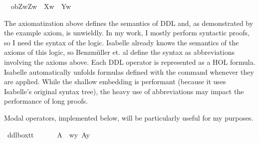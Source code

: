 \begin{isabellebody}
\ \ {\isasymlongrightarrow}ob{\isacharparenleft}Z{\isacharparenright}{\isacharparenleft}{\isasymlambda}w{\isachardot}{\isacharparenleft}Z{\isacharparenleft}w{\isacharparenright}\ {\isasymand}\ {\isasymnot}X{\isacharparenleft}w{\isacharparenright}{\isacharparenright}\ {\isasymor}\ Y{\isacharparenleft}w{\isacharparenright}{\isacharparenright}{\isachardoublequoteclose}\isanewline
%
%
\isadelimdocument
%
\endisadelimdocument
%
\isatagdocument
%
\isamarkuptrue%
%
\endisatagdocument
{\isafolddocument}%
%
\isadelimdocument
%
\endisadelimdocument
%
\begin{isamarkuptext}%
The axiomatization above defines the semantics of DDL and, as demonstrated by the example axiom,
is unwieldly. In my work, I mostly perform syntactic proofs, so I need the syntax of the logic.
Isabelle already knows the semantics of the axioms of this logic, so Benzm\"uller et. al define the syntax as abbreviations 
involving the axioms above. Each DDL operator is represented
as a HOL formula. Isabelle automatically unfolds formulas defined with the  command 
whenever they are applied. While the shallow embedding is performant (because it uses Isabelle's original 
syntax tree), the heavy use of abbreviations may impact the performance of long proofs.%
\end{isamarkuptext}\isamarkuptrue%
%
\begin{isamarkuptext}%
\noindent Modal operators, implemented below, will be particularly useful for my purposes.%
\end{isamarkuptext}\isamarkuptrue%
\isamarkupfalse%
\ ddlbox{\isacharcolon}{\isacharcolon}{\isachardoublequoteopen}t{\isasymRightarrow}t{\isachardoublequoteclose}\ {\isacharparenleft}{\isachardoublequoteopen}{\isasymbox}{\isachardoublequoteclose}{\isacharparenright}\ \isanewline
\ \ \ {\isachardoublequoteopen}{\isasymbox}\ A\ {\isasymequiv}\ {\isasymlambda}w{\isachardot}{\isasymforall}y{\isachardot}\ A{\isacharparenleft}y{\isacharparenright}{\isachardoublequoteclose}\ \isanewline
%
\end{isabellebody}
